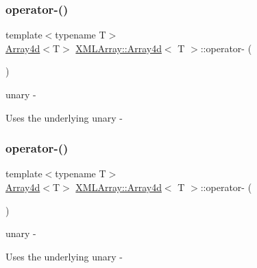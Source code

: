 \subsubsection{\texorpdfstring{operator-\/()}{operator-()}\hspace{0.1cm}{\footnotesize\ttfamily [2/3]}}
{\footnotesize\ttfamily template$<$typename T$>$ \\
\mbox{\hyperlink{classXMLArray_1_1Array4d}{Array4d}}$<$T$>$ \mbox{\hyperlink{classXMLArray_1_1Array4d}{X\+M\+L\+Array\+::\+Array4d}}$<$ T $>$\+::operator-\/ (\begin{DoxyParamCaption}{ }\end{DoxyParamCaption})\hspace{0.3cm}{\ttfamily [inline]}}



unary -\/ 

Uses the underlying unary -\/ \mbox{\label{classXMLArray_1_1Array4d_a33d29c88630265c416d8e8a7355f166e}} 
\subsubsection{\texorpdfstring{operator-\/()}{operator-()}\hspace{0.1cm}{\footnotesize\ttfamily [3/3]}}
{\footnotesize\ttfamily template$<$typename T$>$ \\
\mbox{\hyperlink{classXMLArray_1_1Array4d}{Array4d}}$<$T$>$ \mbox{\hyperlink{classXMLArray_1_1Array4d}{X\+M\+L\+Array\+::\+Array4d}}$<$ T $>$\+::operator-\/ (\begin{DoxyParamCaption}{ }\end{DoxyParamCaption})\hspace{0.3cm}{\ttfamily [inline]}}



unary -\/ 

Uses the underlying unary -\/ \mbox{\label{classXMLArray_1_1Array4d_ad192d15277494d22a81c86852eaa5466}} 
